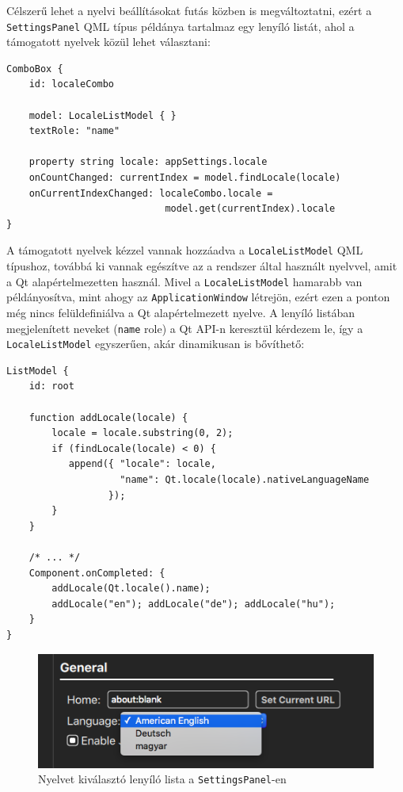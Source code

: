 \documentclass[12pt]{report}
\begin{document}
Célszerű lehet a nyelvi beállításokat futás közben is megváltoztatni, ezért a
\texttt{SettingsPanel} QML típus példánya tartalmaz egy lenyíló listát, ahol a támogatott
nyelvek közül lehet választani:
\begin{lstlisting}[title=main.qml]
ComboBox {
    id: localeCombo

    model: LocaleListModel { }
    textRole: "name"

    property string locale: appSettings.locale
    onCountChanged: currentIndex = model.findLocale(locale)
    onCurrentIndexChanged: localeCombo.locale =
                            model.get(currentIndex).locale
}
\end{lstlisting}
A támogatott nyelvek kézzel vannak hozzáadva a \texttt{LocaleListModel} QML típushoz, továbbá
ki vannak egészítve az a rendszer által használt nyelvvel, amit a Qt alapértelmezetten
használ. Mivel a \texttt{LocaleListModel} hamarabb van példányosítva, mint ahogy az
\texttt{ApplicationWindow} létrejön, ezért ezen a ponton még nincs felüldefiniálva a Qt
alapértelmezett nyelve. A lenyíló listában megjelenített neveket (\texttt{name} role) a
Qt API-n keresztül kérdezem le, így a \texttt{LocaleListModel} egyszerűen, akár dinamikusan
is bővíthető:
\newpage
\begin{lstlisting}[title=models/LocaleListModel.qml]
ListModel {
    id: root

    function addLocale(locale) {
        locale = locale.substring(0, 2);
        if (findLocale(locale) < 0) {
           append({ "locale": locale,
                    "name": Qt.locale(locale).nativeLanguageName
                  });
        }
    }

    /* ... */
    Component.onCompleted: {
        addLocale(Qt.locale().name);
        addLocale("en"); addLocale("de"); addLocale("hu");
    }
}
\end{lstlisting}

\begin{figure}[H]
    \centering
    \includegraphics[scale=0.6]{locale-combo}
    \caption{
        \label{fig:locale-combo}
        Nyelvet kiválasztó lenyíló lista a \texttt{SettingsPanel}-en
    }
\end{figure}
\end{document}
